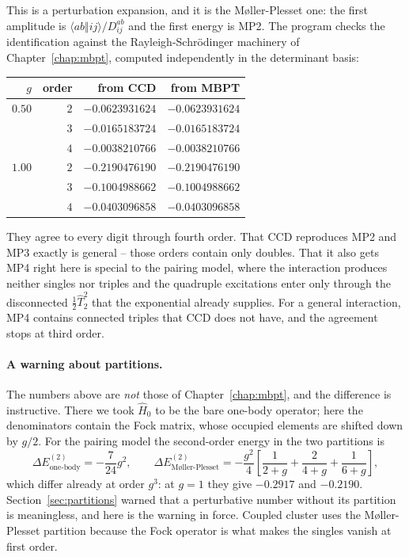 This is a perturbation expansion, and it is the M\o{}ller-Plesset one: the
first amplitude is $\langle ab\Vert ij\rangle/D_{ij}^{ab}$ and the first
energy is MP2.  The program checks the identification against the
Rayleigh-Schr\"odinger machinery of Chapter~\ref{chap:mbpt}, computed
independently in the determinant basis:

\begin{center}
\renewcommand{\arraystretch}{1.2}
\setlength{\tabcolsep}{11pt}
\begin{tabular}{rrrr}
\toprule
$g$ & order & from CCD & from MBPT\\
\midrule
$0.50$ & $2$ & $-0.0623931624$ & $-0.0623931624$\\
       & $3$ & $-0.0165183724$ & $-0.0165183724$\\
       & $4$ & $-0.0038210766$ & $-0.0038210766$\\
$1.00$ & $2$ & $-0.2190476190$ & $-0.2190476190$\\
       & $3$ & $-0.1004988662$ & $-0.1004988662$\\
       & $4$ & $-0.0403096858$ & $-0.0403096858$\\
\bottomrule
\end{tabular}
\end{center}

They agree to every digit through fourth order.  That CCD reproduces MP2 and
MP3 exactly is general -- those orders contain only doubles.  That it also
gets MP4 right here is special to the pairing model, where the interaction
produces neither singles nor triples and the quadruple excitations enter only
through the disconnected $\tfrac12\hat{T}_2^2$ that the exponential already
supplies.  For a general interaction, MP4 contains connected triples that CCD
does not have, and the agreement stops at third order.

\paragraph{A warning about partitions.}
The numbers above are \emph{not} those of Chapter~\ref{chap:mbpt}, and the
difference is instructive.  There we took $\hat{H}_0$ to be the bare one-body
operator; here the denominators contain the Fock matrix, whose occupied
elements are shifted down by $g/2$.  For the pairing model the second-order
energy in the two partitions is
\begin{equation}
  \Delta E^{(2)}_{\text{one-body}} = -\frac{7}{24}g^2,
  \qquad
  \Delta E^{(2)}_{\text{M\o{}ller-Plesset}}
   = -\frac{g^2}{4}\left[\frac{1}{2+g}+\frac{2}{4+g}
     +\frac{1}{6+g}\right],
  \label{eq:10-twopartitions}
\end{equation}
which differ already at order $g^3$: at $g=1$ they give $-0.2917$ and
$-0.2190$.  Section~\ref{sec:partitions} warned that a perturbative number
without its partition is meaningless, and here is the warning in force.
Coupled cluster uses the M\o{}ller-Plesset partition because the Fock operator
is what makes the singles vanish at first order.

